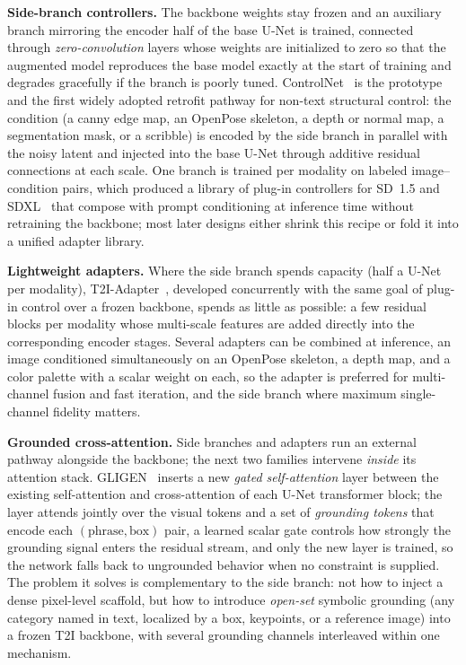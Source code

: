 \textbf{Side-branch controllers.}
The backbone weights stay frozen and an auxiliary branch mirroring the encoder half of the base U-Net is trained, connected through \emph{zero-convolution} layers whose weights are initialized to zero so that the augmented model reproduces the base model exactly at the start of training and degrades gracefully if the branch is poorly tuned.
ControlNet~\cite{zhang2023adding} is the prototype and the first widely adopted retrofit pathway for non-text structural control: the condition (a canny edge map, an OpenPose skeleton, a depth or normal map, a segmentation mask, or a scribble) is encoded by the side branch in parallel with the noisy latent and injected into the base U-Net through additive residual connections at each scale.
One branch is trained per modality on labeled image--condition pairs, which produced a library of plug-in controllers for SD~1.5 and SDXL~\cite{sdxl2023} that compose with prompt conditioning at inference time without retraining the backbone; most later designs either shrink this recipe or fold it into a unified adapter library.

\textbf{Lightweight adapters.}
Where the side branch spends capacity (half a U-Net per modality), T2I-Adapter~\cite{t2iadapter2023}, developed concurrently with the same goal of plug-in control over a frozen backbone, spends as little as possible: a few residual blocks per modality whose multi-scale features are added directly into the corresponding encoder stages.
Several adapters can be combined at inference, an image conditioned simultaneously on an OpenPose skeleton, a depth map, and a color palette with a scalar weight on each, so the adapter is preferred for multi-channel fusion and fast iteration, and the side branch where maximum single-channel fidelity matters.

\textbf{Grounded cross-attention.}
Side branches and adapters run an external pathway alongside the backbone; the next two families intervene \emph{inside} its attention stack.
GLIGEN~\cite{li2023gligen} inserts a new \emph{gated self-attention} layer between the existing self-attention and cross-attention of each U-Net transformer block; the layer attends jointly over the visual tokens and a set of \emph{grounding tokens} that encode each $(\text{phrase},\text{box})$ pair, a learned scalar gate controls how strongly the grounding signal enters the residual stream, and only the new layer is trained, so the network falls back to ungrounded behavior when no constraint is supplied.
The problem it solves is complementary to the side branch: not how to inject a dense pixel-level scaffold, but how to introduce \emph{open-set} symbolic grounding (any category named in text, localized by a box, keypoints, or a reference image) into a frozen T2I backbone, with several grounding channels interleaved within one mechanism.

